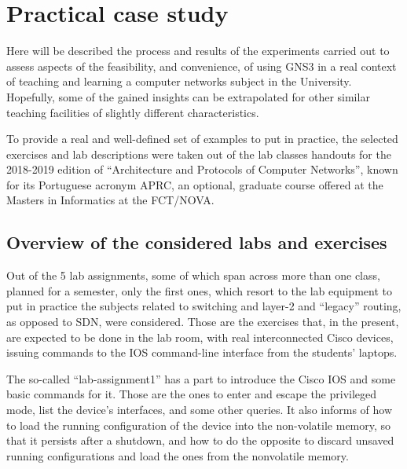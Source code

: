 \section{Practical case study}
\label{sec:gns3practicalcasestudy}

Here will be described the process and results of the experiments carried out to assess aspects of the feasibility, and convenience, of using GNS3 in a real context of teaching and learning a computer networks subject in the University.
Hopefully, some of the gained insights can be extrapolated for other similar teaching facilities of slightly different characteristics.

To provide a real and well-defined set of examples to put in practice, the selected exercises and lab descriptions were taken out of the lab classes handouts for the 2018-2019 edition of ``Architecture and Protocols of Computer Networks'', known for its Portuguese acronym APRC, an optional, graduate course offered at the Masters in Informatics at the FCT/NOVA.

\subsection{Overview of the considered labs and exercises}
\label{subsec:gns3consideredlabs}

Out of the 5 lab assignments, some of which span across more than one class, planned for a semester, only the first ones, which resort to the lab equipment to put in practice the subjects related to switching and layer-2 and ``legacy'' routing, as opposed to SDN, were considered. %
Those are the exercises that, in the present, are expected to be done in the lab room, with real interconnected Cisco devices, issuing commands to the IOS command-line interface from the students' laptops.

The so-called ``lab-assignment1'' has a part to introduce the Cisco IOS and some basic commands for it.
Those are the ones to enter and escape the privileged mode, list the device's interfaces, and some other queries.
It also informs of how to load the running configuration of the device into the non-volatile memory, so that it persists after a shutdown, and how to do the opposite to discard unsaved running configurations and load the ones from the nonvolatile memory.

